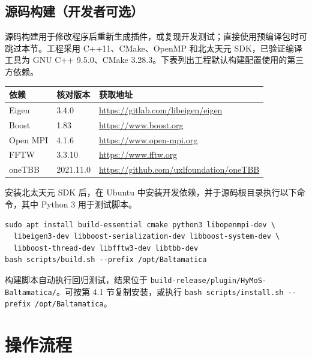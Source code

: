 \documentclass[UTF8,a4paper,11pt,fontset=fandol]{ctexart}
\newcommand{\code}[1]{\nolinkurl{#1}}
\begin{document}
\subsection{源码构建（开发者可选）}
源码构建用于修改程序后重新生成插件，或复现开发测试；直接使用预编译包时可跳过本节。工程采用 C++11、CMake、OpenMP 和北太天元 SDK，已验证编译工具为 GNU C++ 9.5.0、CMake 3.28.3。下表列出工程默认构建配置使用的第三方依赖。
\begin{center}\small
\begin{tabularx}{\textwidth}{@{}p{22mm}p{19mm}Y@{}}
\toprule
依赖 & 核对版本 & 获取地址\\
\midrule
Eigen & 3.4.0 & \url{https://gitlab.com/libeigen/eigen}\\
Boost & 1.83 & \url{https://www.boost.org}\\
Open MPI & 4.1.6 & \url{https://www.open-mpi.org}\\
FFTW & 3.3.10 & \url{https://www.fftw.org}\\
oneTBB & 2021.11.0 & \url{https://github.com/uxlfoundation/oneTBB}\\
\bottomrule
\end{tabularx}
\end{center}
安装北太天元 SDK 后，在 Ubuntu 中安装开发依赖，并于源码根目录执行以下命令，其中 Python 3 用于测试脚本。
\begin{lstlisting}
sudo apt install build-essential cmake python3 libopenmpi-dev \
  libeigen3-dev libboost-serialization-dev libboost-system-dev \
  libboost-thread-dev libfftw3-dev libtbb-dev
bash scripts/build.sh --prefix /opt/Baltamatica
\end{lstlisting}
构建脚本自动执行回归测试，结果位于 \code{build-release/plugin/HyMoS-Baltamatica/}。可按第 4.1 节复制安装，或执行 \lstinline|bash scripts/install.sh --prefix /opt/Baltamatica|。

\Needspace{26\baselineskip}
\section{操作流程}
\end{document}

